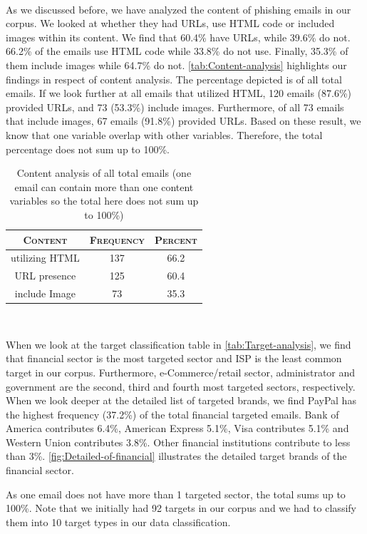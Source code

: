 \ 

As we discussed before, we have analyzed the content of phishing emails
in our corpus. We looked at whether they had URLs, use HTML code or
included images within its content. We find that 60.4\% have URLs,
while 39.6\% do not. 66.2\% of the emails use HTML code while 33.8\%
do not use. Finally, 35.3\% of them include images while 64.7\% do
not. \autoref{tab:Content-analysis} highlights our findings in respect
of content analysis. The percentage depicted is of all total emails.
If we look further at all emails that utilized HTML, 120 emails (87.6\%)
provided URLs, and 73 (53.3\%) include images. Furthermore, of all
73 emails that include images, 67 emails (91.8\%) provided URLs. Based
on these result, we know that one variable overlap with other variables.
Therefore, the total percentage does not sum up to 100\%.

\begin{table}[h]
\centering{}%
\begin{tabular}{ccc}
\toprule 
\textsc{\small{}Content} & \textsc{\small{}Frequency} & \textsc{\small{}Percent}\tabularnewline
\midrule
\midrule 
{\small{}utilizing HTML} & {\small{}137} & 66.2\tabularnewline
\midrule 
{\small{}URL presence} & {\small{}125} & 60.4\tabularnewline
\midrule 
{\small{}include Image} & {\small{}73} & {\small{}35.3}\tabularnewline
\bottomrule
\end{tabular}\protect\caption{\label{tab:Content-analysis}Content analysis of all total emails
(one email can contain more than one content variables so the total
here does not sum up to 100\%)}
\end{table}


\ 

When we look at the target classification table in \autoref{tab:Target-analysis},
we find that financial sector is the most targeted sector and ISP
is the least common target in our corpus. Furthermore, e-Commerce/retail
sector, administrator and government are the second, third and fourth
most targeted sectors, respectively. When we look deeper at the detailed
list of targeted brands, we find PayPal has the highest frequency
(37.2\%) of the total financial targeted emails. Bank of America contributes
6.4\%, American Express 5.1\%, Visa contributes 5.1\% and Western
Union contributes 3.8\%. Other financial institutions contribute to
less than 3\%. \autoref{fig:Detailed-of-financial} illustrates the
detailed target brands of the financial sector.

As one email does not have more than 1 targeted sector, the total
sums up to 100\%. Note that we initially had 92 targets in our corpus
and we had to classify them into 10 target types in our data classification.

